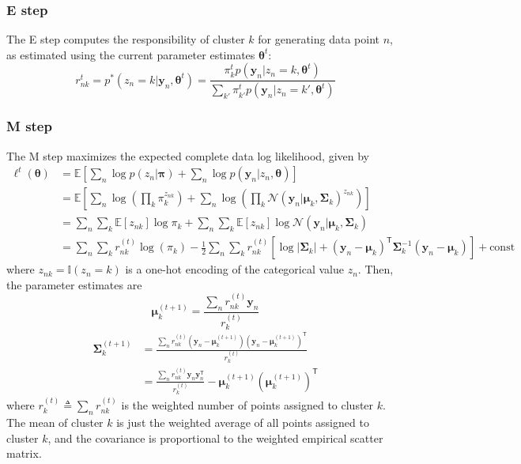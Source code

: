\documentclass[11pt]{article}
\begin{document}
\subsubsection*{E step}
The E step computes the responsibility of cluster $k$ for generating data point $n$, as estimated using the current parameter estimates $\boldsymbol{\theta}^{t}$:
\[
r_{nk}^{t} = p^*(z_n = k | \boldsymbol{y}_n, \boldsymbol{\theta}^{t}) = \frac{\pi_k^{t} p(\boldsymbol{y}_n | z_n=k, \boldsymbol{\theta}^{t})}{\sum_{k'} \pi_{k'}^{t} p(\boldsymbol{y}_n | z_n=k', \boldsymbol{\theta}^{t})}
\]

\subsubsection*{M step}
The M step maximizes the expected complete data log likelihood, given by
\[
\begin{aligned}
\ell^t(\boldsymbol{\theta}) &= \mathbb{E} \left[ \sum_n \log p(z_n | \boldsymbol{\pi}) + \sum_n \log p(\boldsymbol{y}_n | z_n, \boldsymbol{\theta}) \right] \\
&= \mathbb{E} \left[ \sum_n \log \left( \prod_k \pi_k^{z_{nk}} \right) + \sum_n \log \left( \prod_k \mathcal{N}(\boldsymbol{y}_n | \boldsymbol{\mu}_k, \boldsymbol{\Sigma}_k)^{z_{nk}} \right) \right] \\
&= \sum_n \sum_k \mathbb{E}[z_{nk}] \log \pi_k + \sum_n \sum_k \mathbb{E}[z_{nk}] \log \mathcal{N}(\boldsymbol{y}_n | \boldsymbol{\mu}_k, \boldsymbol{\Sigma}_k) \\
&= \sum_n \sum_k r_{nk}^{(t)} \log(\pi_k) - \frac{1}{2} \sum_n \sum_k r_{nk}^{(t)} \left[ \log |\boldsymbol{\Sigma}_k| + (\boldsymbol{y}_n - \boldsymbol{\mu}_k)^\mathsf{T} \boldsymbol{\Sigma}_k^{-1} (\boldsymbol{y}_n - \boldsymbol{\mu}_k) \right] + \text{const}
\end{aligned}
\]
where $z_{nk} = \mathbb{I}(z_n = k)$ is a one-hot encoding of the categorical value $z_n$. Then, the parameter estimates are
\[
\boldsymbol{\mu}_k^{(t+1)} = \frac{\sum_n r_{nk}^{(t)} \boldsymbol{y}_n}{r_k^{(t)}}
\]
\[
\begin{aligned}
\boldsymbol{\Sigma}_k^{(t+1)} &= \frac{\sum_n r_{nk}^{(t)} (\boldsymbol{y}_n - \boldsymbol{\mu}_k^{(t+1)})(\boldsymbol{y}_n - \boldsymbol{\mu}_k^{(t+1)})^\mathsf{T}}{r_k^{(t)}} \\
&= \frac{\sum_n r_{nk}^{(t)} \boldsymbol{y}_n \boldsymbol{y}_n^\mathsf{T}}{r_k^{(t)}} - \boldsymbol{\mu}_k^{(t+1)} (\boldsymbol{\mu}_k^{(t+1)})^\mathsf{T}
\end{aligned}
\]
where $r_k^{(t)} \triangleq \sum_n r_{nk}^{(t)}$ is the weighted number of points assigned to cluster $k$. The mean of cluster $k$ is just the weighted average of all points assigned to cluster $k$, and the covariance is proportional to the weighted empirical scatter matrix.
\end{document}
